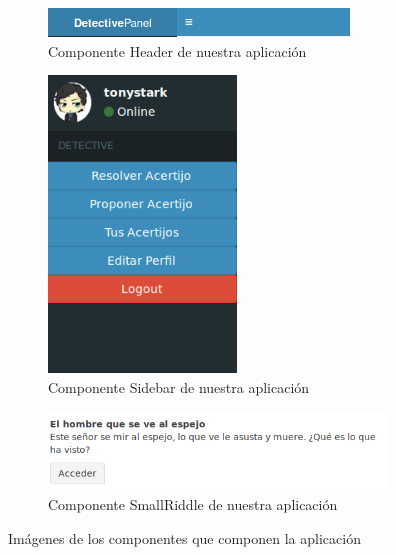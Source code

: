 \begin{figure}[hbtp] \centering
\begin{subfigure}{.6\textwidth}
     \centerline{\includegraphics[width=8cm]{figuras/header.png}}
    \caption{Componente Header de nuestra aplicación}
    \label{fig::header}
\end{subfigure}
\par\bigskip 
\begin{subfigure}{.6\textwidth}
    \centerline{\includegraphics[width=5cm]{figuras/sidebar.png}}
    \caption{Componente Sidebar de nuestra aplicación}
    \label{fig::sidebar}
\end{subfigure}
\par\bigskip 
\begin{subfigure}{.6\textwidth}
     \centerline{\includegraphics[width=9cm]{figuras/smallriddle.png}}
    \caption{Componente SmallRiddle de nuestra aplicación}
    \label{fig::smallriddle}
\end{subfigure}
\caption{Imágenes de los componentes que componen la aplicación}
\end{figure}
